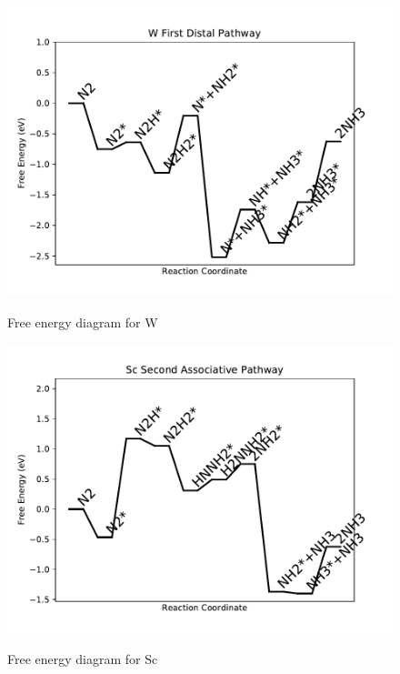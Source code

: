 \documentclass[journal=jacsat,manuscript=article]{achemso}
\begin{document}
\begin{figure}
\includegraphics[width=1\linewidth]{data/plots/W_distal_1.pdf}
\label{fig:W_distal_1}
\caption{Free energy diagram for W}
\end{figure}

\newpage
\begin{figure}
\includegraphics[width=1\linewidth]{data/plots/Sc_associative_2.pdf}
\label{fig:Sc_associative_2}
\caption{Free energy diagram for Sc}
\end{figure}
\end{document}
